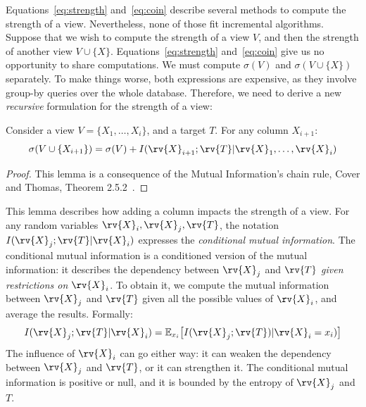 Equations~\ref{eq:strength} and~\ref{eq:coin} describe several methods to
compute the strength of a view. Nevertheless, none of those fit incremental
algorithms.  Suppose that we wish to compute the strength of a view $V$, and
then the strength of another view $V \cup \{X\}$.  Equations~\ref{eq:strength}
and~\ref{eq:coin} give us no opportunity to share computations.  We must
compute $\sigma(V)$ and $\sigma(V \cup \{X\})$ separately. To make things
worse, both expressions are expensive, as they involve group-by queries over
the whole database. Therefore, we need to derive a new \emph{recursive}
formulation for the strength of a view:
\begin{lemma}\label{lem:chain}
Consider a view $V = \{X_1, \ldots, X_i\}$, and a target $T$.
For any column $X_{i+1}$: 
\begin{equation}\label{eq:bonus}
    \sigma(V \cup \{X_{i+1}\}) =  \sigma(V) + I(\rv{X}_{i+1} ; \rv{T} | \rv{X}_1 , \ldots, \rv{X}_i)
\end{equation}
\end{lemma}
\begin{proof}
This lemma is a consequence of the Mutual Information's chain rule,
Cover and Thomas, Theorem 2.5.2~\cite{cover2012elements}.
\end{proof}
This lemma describes how adding a column impacts the strength of a view.  For
any random variables $\rv{X}_i, \rv{X}_j, \rv{T}$, the notation
$I(\rv{X}_j;\rv{T}|\rv{X}_i)$  expresses the \emph{conditional mutual
information}. The conditional mutual information is a conditioned version of
the mutual information: it describes the dependency between $\rv{X}_j$ and
$\rv{T}$ \emph{given restrictions on $\rv{X}_i$}. To obtain it, we compute the
mutual information between $\rv{X}_j$ and $\rv{T}$ given all the possible
values of $\rv{X}_i$, and average the results. Formally:
\begin{equation}\label{eq:condmutinfo}
    I(\rv{X}_j;\rv{T}|\rv{X}_i) = \mathbb{E}_{x_i}\big[ I(\rv{X}_j; \rv{T})| \rv{X}_i = x_i)  \big]
\end{equation}
The influence of $\rv{X}_i$ can go either way: it can weaken the dependency between
$\rv{X}_j$ and $\rv{T}$, or it can strengthen it. The conditional mutual information is
positive or null, and it is bounded by the entropy of $\rv{X}_j$ and $T$. 

